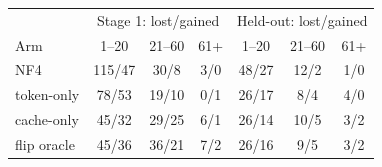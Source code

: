 \begin{tabular}{lcccccc}
\toprule
 & \multicolumn{3}{c}{Stage 1: lost/gained} & \multicolumn{3}{c}{Held-out: lost/gained} \\
Arm & 1--20 & 21--60 & 61+ & 1--20 & 21--60 & 61+ \\
\midrule
NF4 & 115/47 & 30/8 & 3/0 & 48/27 & 12/2 & 1/0 \\
token-only & 78/53 & 19/10 & 0/1 & 26/17 & 8/4 & 4/0 \\
cache-only & 45/32 & 29/25 & 6/1 & 26/14 & 10/5 & 3/2 \\
flip oracle & 45/36 & 36/21 & 7/2 & 26/16 & 9/5 & 3/2 \\
\bottomrule
\end{tabular}
